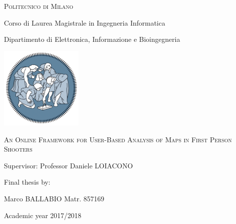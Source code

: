 \documentclass[12pt,a4paper,twoside,openrigth]{book}
\let\LaTeXStandardTableOfContents\tableofcontents
\renewcommand{\tableofcontents}{\begingroup\renewcommand{\itshape}{\relax}\LaTeXStandardTableOfContents\endgroup}
\begin{document}
\frontmatter


\begin{titlepage}
\centering

{\scshape\LARGE Politecnico di Milano \par}
{\Large Corso di Laurea Magistrale in Ingegneria Informatica \par}
{\Large Dipartimento di Elettronica, Informazione e Bioingegneria}

\vspace{1cm} \includegraphics[width=0.3\textwidth]{polimi}\par \vspace{1cm}

{\scshape\LARGE An Online Framework for User-Based Analysis of Maps in First Person Shooters \par}

\raggedright
\vfill\Large Supervisor: Professor Daniele LOIACONO

\vfill \begin{minipage}[t]{0.4\textwidth}\end{minipage} \hfill
\begin{minipage}[t]{0.59\textwidth} \begin{flushright}
\raggedright Final thesis by: \par Marco BALLABIO Matr. 857169
\end{flushright} \end{minipage}

\centering
\vfill\Large Academic year 2017/2018

\end{titlepage}




\tableofcontents

\listoffigures

\listoftables


\mainmatter

\end{document}
